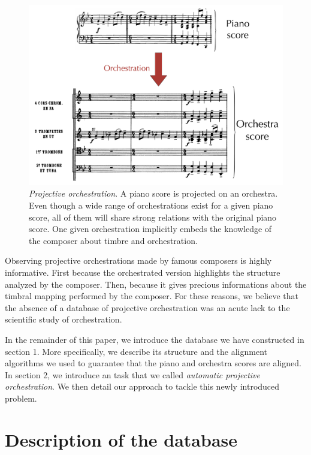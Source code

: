 \documentclass[twoside,twocolumn]{article}
\begin{document}
\begin{figure}
\centering
\includegraphics[scale=0.12]{orch}
\caption{\textit{Projective orchestration}. A piano score is projected on an orchestra. Even though a wide range of orchestrations exist for a given piano score, all of them will share strong relations with the original piano score. One given orchestration implicitly embeds the knowledge of the composer about timbre and orchestration.}
\label{fig:orch}
\end{figure}

Observing projective orchestrations made by famous composers is highly informative. First because the orchestrated version highlights the structure analyzed by the composer. Then, because it gives precious informations about the timbral mapping performed by the composer.
%
%
For these reasons, we believe that the absence of a database of projective orchestration was an acute lack to the scientific study of orchestration.

In the remainder of this paper, we introduce the database we have constructed in section 1. More specifically, we describe its structure and the alignment algorithms we used to guarantee that the piano and orchestra scores are aligned. In section 2, we introduce an task that we called \textit{automatic projective orchestration}. We then detail our approach to tackle this newly introduced problem.


\section{Description of the database}
\end{document}
